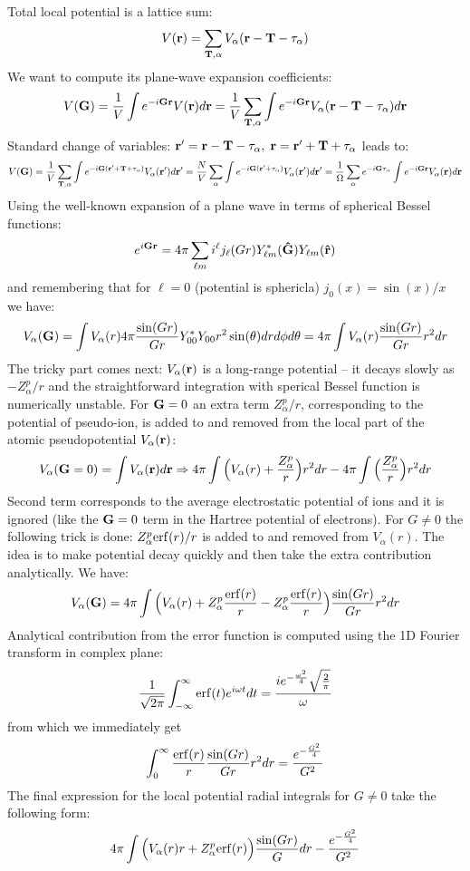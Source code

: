 Total local potential is a lattice sum\+: \[ V({\bf r}) = \sum_{{\bf T},\alpha} V_{\alpha}({\bf r} - {\bf T} - {\bf \tau}_{\alpha}) \] We want to compute it\textquotesingle{}s plane-\/wave expansion coefficients\+: \[ V({\bf G}) = \frac{1}{V} \int e^{-i{\bf Gr}} V({\bf r}) d{\bf r} = \frac{1}{V} \sum_{{\bf T},\alpha} \int e^{-i{\bf Gr}}V_{\alpha}({\bf r} - {\bf T} - {\bf \tau}_{\alpha})d{\bf r} \] Standard change of variables\+: $ {\bf r}' = {\bf r} - {\bf T} - {\bf \tau}_{\alpha},\; {\bf r} = {\bf r}' + {\bf T} + {\bf \tau}_{\alpha} $ leads to\+: \[ V({\bf G}) = \frac{1}{V} \sum_{{\bf T},\alpha} \int e^{-i{\bf G}({\bf r}' + {\bf T} + {\bf \tau}_{\alpha})}V_{\alpha}({\bf r}')d{\bf r'} = \frac{N}{V} \sum_{\alpha} \int e^{-i{\bf G}({\bf r}' + {\bf \tau}_{\alpha})}V_{\alpha}({\bf r}')d{\bf r'} = \frac{1}{\Omega} \sum_{\alpha} e^{-i {\bf G} {\bf \tau}_{\alpha} } \int e^{-i{\bf G}{\bf r}}V_{\alpha}({\bf r})d{\bf r} \] Using the well-\/known expansion of a plane wave in terms of spherical Bessel functions\+: \[ e^{i{\bf G}{\bf r}}=4\pi \sum_{\ell m} i^\ell j_{\ell}(Gr)Y_{\ell m}^{*}({\bf \hat G})Y_{\ell m}({\bf \hat r}) \] and remembering that for $ \ell = 0 $ (potential is sphericla) $ j_{0}(x) = \sin(x) / x $ we have\+: \[ V_{\alpha}({\bf G}) = \int V_{\alpha}(r) 4\pi \frac{\sin(Gr)}{Gr} Y^{*}_{00} Y_{00} r^2 \sin(\theta) dr d \phi d\theta = 4\pi \int V_{\alpha}(r) \frac{\sin(Gr)}{Gr} r^2 dr \] The tricky part comes next\+: $ V_{\alpha}({\bf r}) $ is a long-\/range potential -- it decays slowly as $ -Z_{\alpha}^{p}/r $ and the straightforward integration with sperical Bessel function is numerically unstable. For $ {\bf G} = 0 $ an extra term $ Z_{\alpha}^p/r $, corresponding to the potential of pseudo-\/ion, is added to and removed from the local part of the atomic pseudopotential $ V_{\alpha}({\bf r}) $\+: \[ V_{\alpha}({\bf G} = 0) = \int V_{\alpha}({\bf r})d{\bf r} \Rightarrow 4\pi \int \Big( V_{\alpha}(r) + \frac{Z_{\alpha}^p}{r} \Big) r^2 dr - 4\pi \int \Big( \frac{Z_{\alpha}^p}{r} \Big) r^2 dr \] Second term corresponds to the average electrostatic potential of ions and it is ignored (like the $ {\bf G} = 0 $ term in the Hartree potential of electrons). For $ G \ne 0 $ the following trick is done\+: $ Z_{\alpha}^p {\rm erf}(r) / r $ is added to and removed from $ V_{\alpha}(r) $. The idea is to make potential decay quickly and then take the extra contribution analytically. We have\+: \[ V_{\alpha}({\bf G}) = 4\pi \int \Big(V_{\alpha}(r) + Z_{\alpha}^p \frac{{\rm erf}(r)} {r} - Z_{\alpha}^p \frac{{\rm erf}(r)}{r}\Big) \frac{\sin(Gr)}{Gr} r^2 dr \] Analytical contribution from the error function is computed using the 1\+D Fourier transform in complex plane\+: \[ \frac{1}{\sqrt{2 \pi}} \int_{-\infty}^{\infty} {\rm erf}(t) e^{i\omega t} dt = \frac{i e^{-\frac{\omega ^2}{4}} \sqrt{\frac{2}{\pi }}}{\omega } \] from which we immediately get \[ \int_{0}^{\infty} \frac{{\rm erf}(r)}{r} \frac{\sin(Gr)}{Gr} r^2 dr = \frac{e^{-\frac{G^2}{4}}}{G^2} \] The final expression for the local potential radial integrals for $ G \ne 0 $ take the following form\+: \[ 4\pi \int \Big(V_{\alpha}(r) r + Z_{\alpha}^p {\rm erf}(r) \Big) \frac{\sin(Gr)}{G} dr - \frac{e^{-\frac{G^2}{4}}}{G^2} \] 

